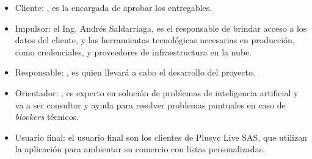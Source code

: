 \documentclass[
11pt, %
]{charter}
\begin{document}
 






 

\begin{itemize}
	\item Cliente: \clientename, es la encargada de aprobar los entregables.
  \item Impulsor: el Ing. Andrés Saldarriaga, es el responsable de brindar acceso a los datos del cliente, y las herramientas tecnológicas necesarias en producción, como credenciales, y proveedores de infraestructura en la nube.
  \item Responsable: \authorname, es quien llevará a cabo el desarrollo del proyecto.
	\item Orientador: \supname, es experto en solución de problemas de inteligencia artificial y va a ser consultor y ayuda para resolver problemas puntuales en caso de \textit{blockers} técnicos.
  \item Usuario final: el usuario final son los clientes de Plusyc Live SAS, que utilizan la aplicación para ambientar su comercio con listas personalizadas.
\end{itemize}
\end{document}
